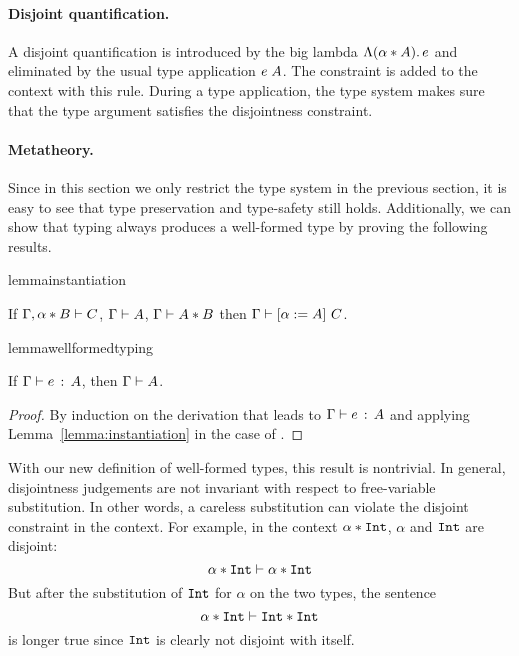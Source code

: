 \paragraph{Disjoint quantification.} A disjoint quantification is introduced by
the big lambda $\Lambda (\alpha * A).\, e$ and eliminated by the usual type
application $e \; A$. The constraint is added to the context with this rule.
During a type application, the type system makes sure that the type argument
satisfies the disjointness constraint.

\paragraph{Metatheory.}

Since in this section we only restrict the type system in the previous section,
it is easy to see that type preservation and type-safety still holds.
Additionally, we can show that typing always produces a well-formed type by
proving the following results.

\begin{restatable}[Instantiation]{lemma}{instantiation}
  \label{lemma:instantiation}

  If $\Gamma, \alpha * B \vdash C$, $\Gamma \vdash A$, $\Gamma \vdash A * B$
  then $\Gamma \vdash \lbrack \alpha := A \rbrack~ C$.
\end{restatable}

\begin{restatable}{lemma}{wellformedtyping}
  \label{lemma:wellformed-typing}

  If $\Gamma \vdash e \ \!:\! \ A$, then $\Gamma \vdash A$.
\end{restatable}

\begin{proof}
  By induction on the derivation that leads to $\Gamma \vdash e \ \!:\! \ A$ and applying
  Lemma~\ref{lemma:instantiation} in the case of .
\end{proof}

With our new definition of well-formed types, this result is nontrivial.
In general, disjointness judgements are not invariant with respect to
free-variable substitution. In other words, a careless substitution can violate
the disjoint constraint in the context. For example, in the context $\alpha
* \texttt{Int}$, $\alpha$ and $\texttt{Int}$ are disjoint:
\[ \alpha * \texttt{Int} \vdash \alpha * \texttt{Int} \]
But after the substitution of $\texttt{Int}$ for $\alpha$ on the two types, the sentence
\[ \alpha * \texttt{Int} \vdash \texttt{Int} * \texttt{Int} \]
is longer true since $\texttt{Int}$ is clearly not disjoint with itself.


